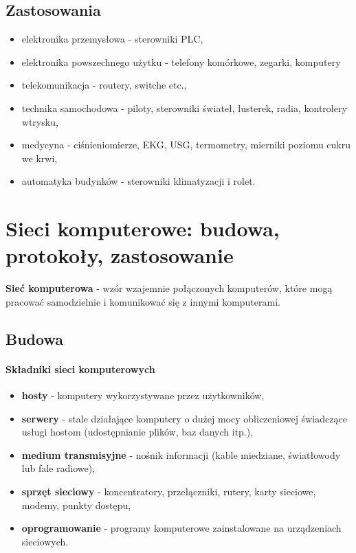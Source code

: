 \documentclass[a4paper,twoside]{report}
\begin{document}
\subsection{Zastosowania}
\begin{itemize}
\item elektronika przemysłowa - sterowniki PLC,
\item elektronika powszechnego użytku - telefony komórkowe, zegarki, komputery
\item telekomunikacja - routery, switche etc.,
\item technika samochodowa - piloty, sterowniki świateł, lusterek, radia, kontrolery wtrysku,
\item medycyna - ciśnieniomierze, EKG, USG, termometry, mierniki poziomu cukru we krwi,
\item automatyka budynków - sterowniki klimatyzacji i rolet.
\end{itemize}

\section{Sieci komputerowe: budowa, protokoły, zastosowanie}

\textbf{Sieć komputerowa} - wzór wzajemnie połączonych komputerów, które mogą pracować samodzielnie i komunikować się z innymi komputerami.

\subsection{Budowa}

\paragraph{Składniki sieci komputerowych}
\begin{itemize}
\item \textbf{hosty} - komputery wykorzystywane przez użytkowników,
\item \textbf{serwery} - stale działające komputery o dużej mocy obliczeniowej świadczące usługi hostom (udostępnianie plików, baz danych itp.),
\item \textbf{medium transmisyjne} - nośnik informacji (kable miedziane, światłowody lub fale radiowe),
\item \textbf{sprzęt sieciowy} - koncentratory, przełączniki, rutery, karty sieciowe, modemy, punkty dostępu,
\item \textbf{oprogramowanie} - programy komputerowe zainstalowane na urządzeniach sieciowych.
\end{itemize}
\end{document}

